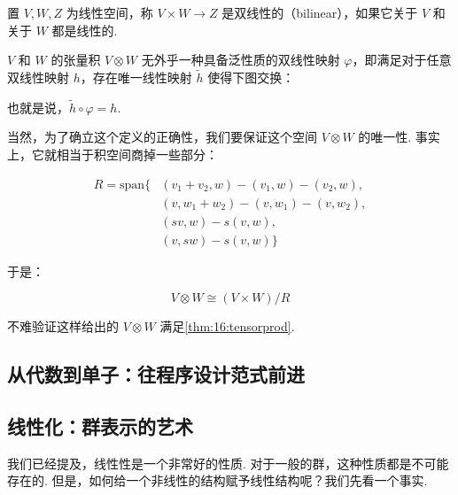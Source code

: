 \begin{definition}
    置 $V, W, Z$ 为线性空间，称 $V \times W \to Z$ 是双线性的（bilinear），如果它关于 $V$ 和关于 $W$ 都是线性的.
\end{definition}

\begin{definition} \label{thm:16:tensorprod}
    $V$ 和 $W$ 的张量积 $V \otimes W$ 无外乎一种具备泛性质的双线性映射 $\varphi$，即满足对于任意双线性映射 $h$，存在唯一线性映射 $\tilde h$ 使得下图交换：

    \begin{center}
    \end{center}

    也就是说，$\tilde h \circ \varphi = h$.
\end{definition}

当然，为了确立这个定义的正确性，我们要保证这个空间 $V \otimes W$ 的唯一性. 事实上，它就相当于积空间商掉一些部分：

\begin{align*}
    R = \mathrm{span}\{&(v_1 + v_2, w) - (v_1, w) - (v_2, w), \\
    & (v, w_1 + w_2) - (v, w_1) - (v, w_2), \\
    & (sv, w) - s(v, w), \\
    & (v, sw) - s(v, w)\}
\end{align*}

于是：

\[
V \otimes W \cong (V \times W) / R
\]

不难验证这样给出的 $V \otimes W$ 满足\autoref{thm:16:tensorprod}.


\subsection{从代数到单子：往程序设计范式前进}

\subsection{线性化：群表示的艺术}

我们已经提及，线性性是一个非常好的性质. 对于一般的群，这种性质都是不可能存在的. 但是，如何给一个非线性的结构赋予线性结构呢？我们先看一个事实.

